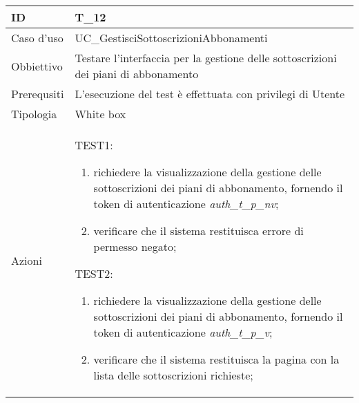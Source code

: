 \begin{table}[hb]
    \centering
    \begin{tabular}{ |p{2cm}|p{10cm}|  }
        \hline
        ID          & T\_12                                                                               \\\hline
        Caso d'uso  & UC\_GestisciSottoscrizioniAbbonamenti                                               \\\hline
        Obbiettivo  & Testare l'interfaccia per la gestione delle sottoscrizioni dei piani di abbonamento \\\hline
        Prerequsiti & L'esecuzione del test è effettuata con privilegi di Utente                          \\\hline
        Tipologia   & White box                                                                           \\\hline
        Azioni      &
        TEST1:
        \begin{enumerate}[nosep, topsep=0pt]
            \item richiedere la visualizzazione della gestione delle sottoscrizioni dei piani di abbonamento, fornendo il token di autenticazione \emph{auth\_t\_p\_nv};
            \item verificare che il sistema restituisca errore di permesso negato;
        \end{enumerate}
        \vspace{0.5cm} TEST2:
        \begin{enumerate}[nosep, topsep=0pt]
            \item richiedere la visualizzazione della gestione delle sottoscrizioni dei piani di abbonamento, fornendo il token di autenticazione \emph{auth\_t\_p\_v};
            \item verificare che il sistema restituisca la pagina con la lista delle sottoscrizioni richieste;
        \end{enumerate}
        \\\hline
    \end{tabular}
\end{table}

